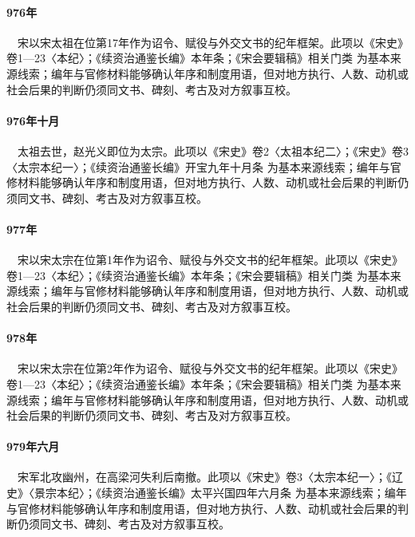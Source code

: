 \paragraph{976年}　宋以宋太祖在位第17年作为诏令、赋役与外交文书的纪年框架。此项以《宋史》卷1—23〈本纪〉；《续资治通鉴长编》本年条；《宋会要辑稿》相关门类 为基本来源线索；编年与官修材料能够确认年序和制度用语，但对地方执行、人数、动机或社会后果的判断仍须同文书、碑刻、考古及对方叙事互校。

\paragraph{976年十月}　太祖去世，赵光义即位为太宗。此项以《宋史》卷2〈太祖本纪二〉；《宋史》卷3〈太宗本纪一〉；《续资治通鉴长编》开宝九年十月条 为基本来源线索；编年与官修材料能够确认年序和制度用语，但对地方执行、人数、动机或社会后果的判断仍须同文书、碑刻、考古及对方叙事互校。

\paragraph{977年}　宋以宋太宗在位第1年作为诏令、赋役与外交文书的纪年框架。此项以《宋史》卷1—23〈本纪〉；《续资治通鉴长编》本年条；《宋会要辑稿》相关门类 为基本来源线索；编年与官修材料能够确认年序和制度用语，但对地方执行、人数、动机或社会后果的判断仍须同文书、碑刻、考古及对方叙事互校。

\paragraph{978年}　宋以宋太宗在位第2年作为诏令、赋役与外交文书的纪年框架。此项以《宋史》卷1—23〈本纪〉；《续资治通鉴长编》本年条；《宋会要辑稿》相关门类 为基本来源线索；编年与官修材料能够确认年序和制度用语，但对地方执行、人数、动机或社会后果的判断仍须同文书、碑刻、考古及对方叙事互校。

\paragraph{979年六月}　宋军北攻幽州，在高梁河失利后南撤。此项以《宋史》卷3〈太宗本纪一〉；《辽史》〈景宗本纪〉；《续资治通鉴长编》太平兴国四年六月条 为基本来源线索；编年与官修材料能够确认年序和制度用语，但对地方执行、人数、动机或社会后果的判断仍须同文书、碑刻、考古及对方叙事互校。

